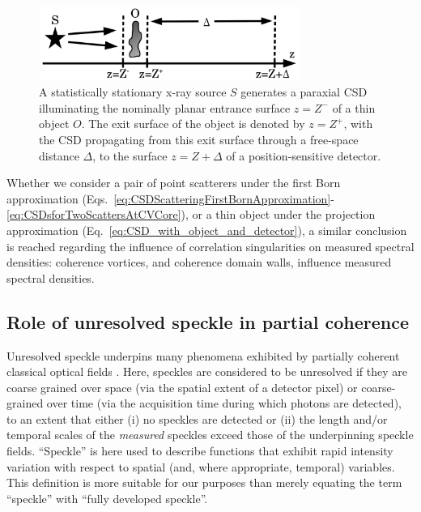 \documentclass[%
 reprint,
 amsmath,amssymb,
 aps,
]{revtex4-1}
\begin{document}
\begin{figure}
\includegraphics[width=8.5cm]{Figures/ImagingWithCoherenceVortex.png}
\caption{A statistically stationary x-ray source $S$ generates a paraxial CSD illuminating the nominally planar entrance surface $z=Z^-$ of a thin object $O$.  The exit surface of the object is denoted by $z=Z^+$, with the CSD propagating from this exit surface through a free-space distance $\Delta$, to the surface $z=Z+\Delta$ of a position-sensitive detector.}
\label{fig:ImagingWithCoherenceVortex}
\end{figure}

Whether we consider a pair of point scatterers under the first Born approximation (Eqs.~\ref{eq:CSDScatteringFirstBornApproximation}-\ref{eq:CSDsforTwoScattersAtCVCore}), or a thin object under the projection approximation (Eq.~\ref{eq:CSD_with_object_and_detector}), a similar conclusion is reached regarding the influence of correlation singularities on measured spectral densities: coherence vortices, and coherence domain walls, influence measured spectral densities.  

\subsection{Role of unresolved speckle in partial coherence}\label{subsec:Discussion-part-2}

Unresolved speckle underpins many phenomena exhibited by partially coherent classical optical fields \cite{Nugent2003,paganin_book,Nesterets2008}.  Here, speckles are considered to be unresolved if they are coarse grained over space (via the spatial extent of a detector pixel) or coarse-grained over time (via the acquisition time during which photons are detected), to an extent that either (i) no speckles are detected or (ii) the length and/or temporal scales of the {\em measured} speckles exceed those of the underpinning speckle fields.  ``Speckle'' is here used to describe functions that exhibit rapid intensity variation with respect to spatial (and, where appropriate, temporal) variables. This definition is more suitable for our purposes than merely equating the term ``speckle'' with ``fully developed speckle''. 
\end{document}
